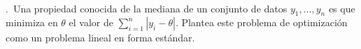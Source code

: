 \documentclass[11pt,a4paper,twoside]{article}
\newcounter{problem} \setcounter{problem}{1}
\newcommand{\ex}{\noindent {\sf \bf \theproblem}\addtocounter{problem}{1}.\ }
\begin{document}
\

\ex Una propiedad conocida de la mediana de un conjunto de datos $y_1,\ldots,y_n$ es que  minimiza en $\theta$ el valor de $\sum_{i=1}^n |y_i-\theta |$. Plantea este problema de optimización como un problema  lineal en forma estándar. 


\end{document}
